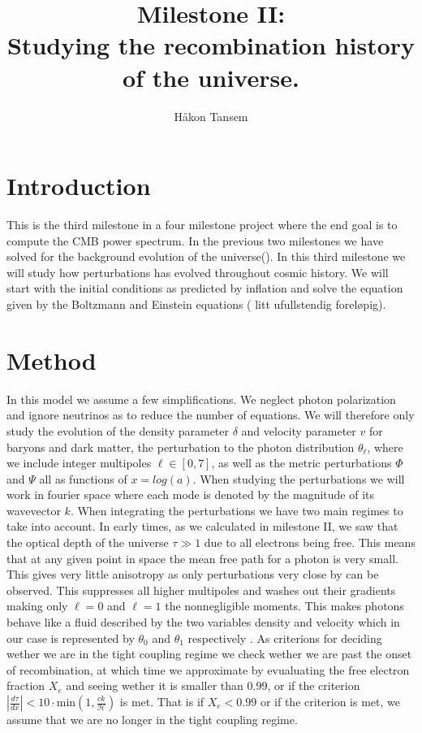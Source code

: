 \documentclass[onecolumn]{aastex62}
\begin{document}
\title{\Large Milestone II:\\Studying the recombination history of the universe.}


\author{Håkon Tansem}

\section{Introduction} \label{sec:intro}
This is the third milestone in a four milestone project where the end goal is to compute the CMB power spectrum. In the previous two milestones we have solved for the background evolution of the universe(). In this third milestone we will study how perturbations has evolved throughout cosmic history. We will start with the initial conditions as predicted by inflation and solve the equation given by the Boltzmann and Einstein equations ( litt ufullstendig foreløpig).
\section{Method} \label{sec:method}
In this model we assume a few simplifications. We neglect photon polarization and ignore neutrinos as to reduce the number of equations. We will therefore only study the evolution of the density parameter $\delta$ and velocity parameter $v$ for baryons and dark matter, the perturbation to the photon distribution $\theta_{\ell}$, where we include integer multipoles $\ell\in[0, 7]$, as well as the metric perturbations $\Phi$ and $\Psi$ all as functions of $x=log(a)$. When studying the perturbations we will work in fourier space where each mode is denoted by the magnitude of its wavevector $k$. When integrating the perturbations we have two main regimes to take into account. In early times, as we calculated in milestone II, we saw that the optical depth of the universe $\tau\gg1$ due to all electrons being free. This means that at any given point in space the mean free path for a photon is very small. This gives very little anisotropy as only perturbations very close by can be observed. This suppresses all higher multipoles and washes out their gradients making only $\ell=0$ and $\ell=1$ the nonnegligible moments. This makes photons behave like a fluid described by the two variables density and velocity which in our case is represented by $\theta_0$ and $\theta_1$ respectively \citep[p. 225]{Dodelson:1282338}. As criterions for deciding wether we are in the tight coupling regime we check wether we are past the onset of recombination, at which time we approximate by evualuating the free electron fraction $X_e$ and seeing wether it is smaller than $0.99$, or if the criterion $\left|\frac{d\tau}{dx}\right| < 10 \cdot \text{min}(1, \frac{ck}{\mathcal{H}})$ is met. That is if $X_e < 0.99$ or if the criterion is met, we assume that we are no longer in the tight coupling regime.\\\indent
\end{document}
